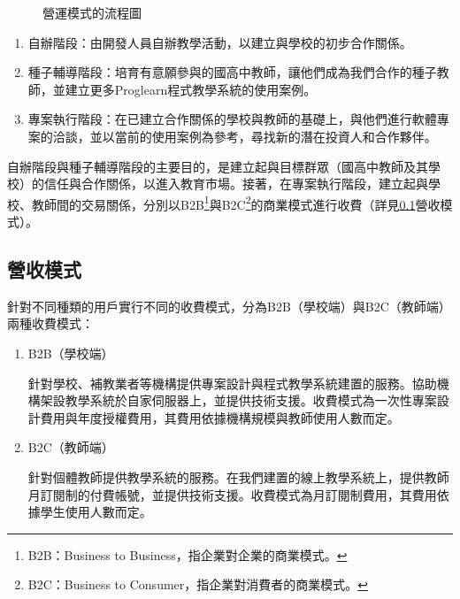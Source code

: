 \begin{figure}[h]
  \centering
  \caption{營運模式的流程圖}
\end{figure}


\begin{enumerate}
  \setlength{\parindent}{2em}
  \item 自辦階段：由開發人員自辦教學活動，以建立與學校的初步合作關係。
  \item 種子輔導階段：培育有意願參與的國高中教師，讓他們成為我們合作的種子教師，並建立更多Proglearn程式教學系統的使用案例。
  \item 專案執行階段：在已建立合作關係的學校與教師的基礎上，與他們進行軟體專案的洽談，並以當前的使用案例為參考，尋找新的潛在投資人和合作夥伴。
\end{enumerate}

自辦階段與種子輔導階段的主要目的，是建立起與目標群眾（國高中教師及其學校）的信任與合作關係，以進入教育市場。接著，在專案執行階段，建立起與學校、教師間的交易關係，分別以B2B\footnote{B2B：Business to Business，指企業對企業的商業模式。}與B2C\footnote{B2C：Business to Consumer，指企業對消費者的商業模式。}的商業模式進行收費（詳見\ref{sec:revenue}營收模式）。

\subsection{營收模式} %
\label{sec:revenue}
針對不同種類的用戶實行不同的收費模式，分為B2B（學校端）與B2C（教師端）兩種收費模式：

\begin{enumerate}
  \setlength{\parindent}{2em}
  \item B2B（學校端）
  \par 針對學校、補教業者等機構提供專案設計與程式教學系統建置的服務。協助機構架設教學系統於自家伺服器上，並提供技術支援。收費模式為一次性專案設計費用與年度授權費用，其費用依據機構規模與教師使用人數而定。
  \item B2C（教師端）
  \par 針對個體教師提供教學系統的服務。在我們建置的線上教學系統上，提供教師月訂閱制的付費帳號，並提供技術支援。收費模式為月訂閱制費用，其費用依據學生使用人數而定。
\end{enumerate}